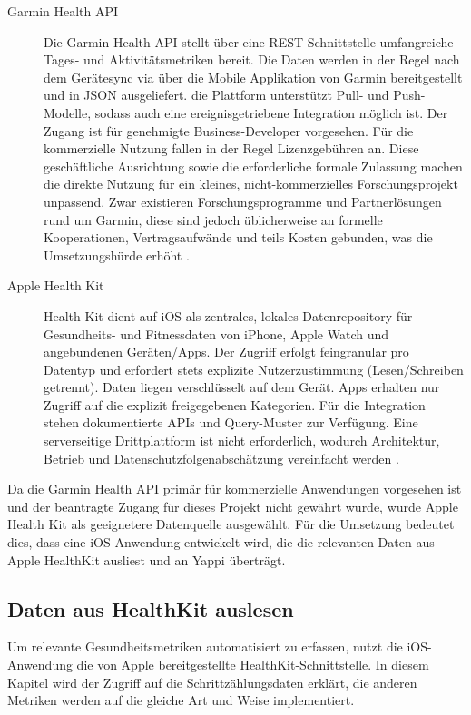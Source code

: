 \documentclass[12pt,a4paper]{report}
\begin{document}
\begin{description}
  \item[Garmin Health API] Die Garmin Health API stellt über eine REST-Schnittstelle umfangreiche Tages- und Aktivitätsmetriken
    bereit. Die Daten werden in der Regel nach dem Gerätesync via über die Mobile Applikation von Garmin bereitgestellt und in
    JSON ausgeliefert. die Plattform unterstützt Pull- und Push-Modelle, sodass auch eine ereignisgetriebene Integration möglich
    ist. Der Zugang ist für genehmigte Business-Developer vorgesehen. Für die kommerzielle Nutzung fallen in der Regel
    Lizenzgebühren an. Diese geschäftliche Ausrichtung sowie die erforderliche formale Zulassung machen die direkte Nutzung für
    ein kleines, nicht-kommerzielles Forschungsprojekt unpassend. Zwar existieren Forschungsprogramme und Partnerlösungen rund um
    Garmin, diese sind jedoch üblicherweise an formelle Kooperationen, Vertragsaufwände und teils Kosten gebunden, was die
    Umsetzungshürde erhöht \cite{garmin_healthapi_2025}.
  \item[Apple Health Kit] Health Kit dient auf iOS als zentrales, lokales Datenrepository für Gesundheits- und Fitnessdaten von
    iPhone, Apple Watch und angebundenen Geräten/Apps. Der Zugriff erfolgt feingranular pro Datentyp und erfordert stets explizite
    Nutzerzustimmung (Lesen/Schreiben getrennt). Daten liegen verschlüsselt auf dem Gerät. Apps erhalten nur Zugriff auf die
    explizit freigegebenen Kategorien. Für die Integration stehen dokumentierte APIs und Query-Muster zur Verfügung. Eine
    serverseitige Drittplattform ist nicht erforderlich, wodurch Architektur, Betrieb und Datenschutzfolgenabschätzung vereinfacht
    werden \cite{apple_healthkit_2025}.
\end{description}

Da die Garmin Health API primär für kommerzielle Anwendungen vorgesehen ist und der beantragte Zugang für dieses Projekt nicht
gewährt wurde, wurde Apple Health Kit als geeignetere Datenquelle ausgewählt. Für die Umsetzung bedeutet dies, dass eine
iOS-Anwendung entwickelt wird, die die relevanten Daten aus Apple HealthKit ausliest und an Yappi überträgt.

\subsection{Daten aus HealthKit auslesen}

Um relevante Gesundheitsmetriken automatisiert zu erfassen, nutzt die iOS-Anwendung die von Apple bereitgestellte
HealthKit-Schnittstelle. In diesem Kapitel wird der Zugriff auf die Schrittzählungsdaten erklärt, die anderen Metriken werden
auf die gleiche Art und Weise implementiert. 
\end{document}
